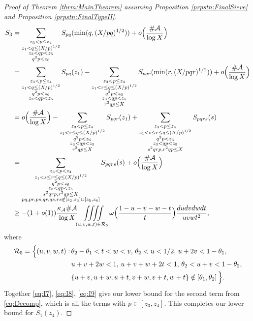 \documentclass[10pt]{amsart}
\theoremstyle{plain}
\numberwithin{sblmm}{thrm}
\numberwithin{equation}{section}
\begin{document}
\begin{proof}[Proof of Theorem \ref{thrm:MainTheorem} assuming Proposition \ref{prpstn:FinalSieve} and Proposition \ref{prpstn:FinalTypeII}]
%
\begingroup
\allowdisplaybreaks
\begin{align}
S_3&=\sum_{\substack{z_3<p\le z_4\\ z_1<q\le (X/p)^{1/2}\\ z_3<q p<z_5 \\ q^2p <z_6}}S_{p q}(\min(q,(X/p q)^{1/2}))+o\Bigl(\frac{\#\mathcal{A}}{\log{X}}\Bigr)\nonumber\\
&=\sum_{\substack{z_3<p\le z_4\\ z_1<q\le (X/p)^{1/2} \\ q^2p <z_6\\ z_3<q p<z_5}}S_{p q}(z_1)-\sum_{\substack{z_3<p\le z_4\\ z_1<r\le q\le (X/p)^{1/2} \\ q^2p <z_6\\ z_3<q p<z_5\\ r^2q p\le X}}S_{p q r}(\min(r,(X/p q r)^{1/2}))%
+o\Bigl(\frac{\#\mathcal{A}}{\log{X}}\Bigr)\nonumber\\
%
%
&=o\Bigl(\frac{\#\mathcal{A}}{\log{X}}\Bigr)-\sum_{\substack{z_3<p\le z_4\\ z_1<r\le q\le (X/p)^{1/2} \\ q^2p <z_6\\ z_3<q p<z_5\\ r^2q p\le X}}S_{p q r}(z_1)%
%
+\sum_{\substack{z_3<p\le z_4\\ z_1<s\le r\le q\le (X/p)^{1/2} \\ q^2p <z_6\\ z_3<q p<z_5\\ s^2q r p, r^2 q p\le X}}S_{p q r s}(s)\nonumber\\
&=\sum_{\substack{z_3<p<z_4\\ z_1<s\le r\le q\le (X/p)^{1/2} \\ q^2p<z_6 \\ z_3<q p<z_5\\ s^2q r p, r^2 q p\le X \\ p q, p r, p s, q r, q s, r s\notin[z_2,z_3]\cup[z_5,z_6]}}S_{p q r s}(s)+o\Bigl(\frac{\#\mathcal{A}{}}{\log{X}}\Bigr)\nonumber\\
&\ge -(1+o(1))\frac{\kappa_{\mathcal{A}}\#\mathcal{A}{}}{\log{X}}\iiiint\limits_{(u,v,w,t)\in\mathcal{R}_5}\omega\Bigl(\frac{1-u-v-w-t}{t}\Bigr)\frac{d u d v d w d t}{ u v w t^2},\label{eq:I9}
\end{align}
\endgroup
%
where
%
\begin{align*}
\mathcal{R}_5=\Bigl\{(u,v,w,t):\, &\theta_2-\theta_1<t<w<v,\, \theta_2<u<1/2,\, u+2v<1-\theta_1,\\
&u+v+2w<1,\, u+v+w+2t<1,\, \theta_2<u+v<1-\theta_2,\\
&\{u+v,u+w,u+t,v+w,v+t,w+t\}\notin[\theta_1,\theta_2]\,\Bigr\}.
\end{align*}
%
Together \eqref{eq:I7}, \eqref{eq:I8}, \eqref{eq:I9} give our lower bound for the second term from \eqref{eq:Decomp}, which is all the terms with $p\in[z_3,z_4]$. This completes our lower bound for $S_1(z_4)$.


\end{proof}
\end{document}
